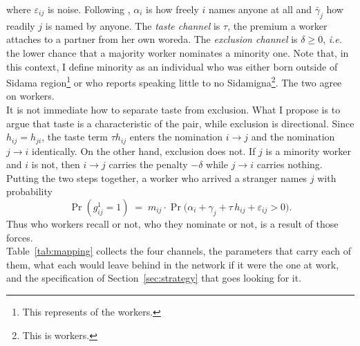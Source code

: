 \noindent where $\varepsilon_{ij}$ is noise. Following \citet{graham2017econometric}, $\alpha_i$ is how freely $i$ names anyone at all and $\bar{\gamma}_j$ how readily $j$ is named by anyone. The \textit{taste channel} is $\tau$, the premium a worker attaches to a partner from her own woreda. The \textit{exclusion channel} is $\delta \geq 0$, \textit{i.e.} the lower chance that a majority worker nominates a minority one. Note that, in this context, I define minority as an individual who was either born outside of Sidama region\footnote{This represents \pnChanMinorityRegionN{} of the \pnAnalysisN{} workers.} or who reports speaking little to no Sidamigna\footnote{This is \pnChanMinorityLangN{} workers.}.  The two agree on \pnChanMinorityBothN{} workers. \\

\noindent It is not immediate how to separate taste from exclusion. What I propose is to argue that taste is a characteristic of the pair, while exclusion is directional. Since $h_{ij} = h_{ji}$, the taste term $\tau h_{ij}$ enters the nomination $i \to j$ and the nomination $j \to i$ identically. On the other hand, exclusion does not. If $j$ is a minority worker and $i$ is not, then $i \to j$ carries the penalty $-\delta$ while $j \to i$ carries nothing.\\

\noindent Putting the two steps together, a worker who arrived a stranger
names $j$ with probability
\[
\Pr(g^1_{ij}=1) \;=\; m_{ij} \cdot
\Pr\big(\alpha_i + \gamma_j + \tau\, h_{ij} + \varepsilon_{ij} > 0\big).
\]
Thus who workers recall or not, who they nominate or not, is a result of those forces.  \\

\noindent Table~\ref{tab:mapping} collects the four channels, the
parameters that carry each of them, what each would leave behind in the
network if it were the one at work, and the specification of
Section~\ref{sec:strategy} that goes looking for it. \\

